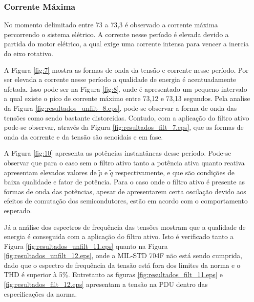 \FloatBarrier

\subsubsection{Corrente Máxima}

No momento delimitado entre 73 a 73,3 é observado a corrente máxima percorrendo o sistema elétrico. A corrente nesse período é elevada devido a partida do motor elétrico, a qual exige uma corrente intensa para vencer a inercia do eixo rotativo.

A Figura \ref{fig:7} mostra as formas de onda da tensão e corrente nesse período. Por ser elevada a corrente nesse período a qualidade de energia é acentuadamente afetada. Isso pode ser na Figura \ref{fig:8}, onde é apresentado um pequeno intervalo a qual existe o pico de corrente máximo entre 73,12 e 73,13 segundos. Pela analise da Figura \ref{fig:resultados_unfilt_8.eps}, pode-se observar a forma de onda das tensões como sendo bastante distorcidas. Contudo, com a aplicação do filtro ativo pode-se observar, através da Figura \ref{fig:resultados_filt_7.eps}, que as formas de onda da corrente e da tensão são senoidais e em fase.

A Figura \ref{fig:10} apresenta as potências instantâneas desse período. Pode-se observar que para o caso sem o filtro ativo tanto a potência ativa quanto reativa apresentam elevados valores de $\tilde{p}$ e $\tilde{q}$ respectivamente, e que são condições de baixa qualidade e fator de potência. Para o caso onde o filtro ativo é presente as formas de onda das potências, apesar de apresentarem certa oscilação devido aos efeitos de comutação dos semicondutores, estão em acordo com o comportamento esperado.

Já a análise dos espectros de frequência das tensões mostram que a qualidade de energia é conseguida com a aplicação do filtro ativo. Isto é verificado tanto a Figura \ref{fig:resultados_unfilt_11.eps} quanto na Figura \ref{fig:resultados_unfilt_12.eps}, onde a MIL-STD 704F não está sendo cumprida, dado que o espectro de frequência da tensão está fora dos limites da norma e o THD é superior à 5\%. Entretanto as figuras \ref{fig:resultados_filt_11.eps} e \ref{fig:resultados_filt_12.eps} apresentam a tensão na PDU dentro das especificações da norma.


